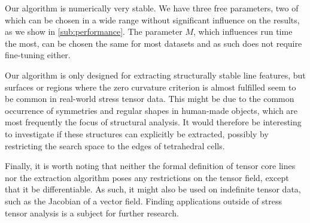 %
Our algorithm is numerically very stable.
%
We have three free parameters, two of which can be chosen in a wide range
without significant influence on the results, as we show in
\cref{sub:performance}.
%
The parameter $M$, which influences run time the most, can be chosen the same
for most datasets and as such does not require fine-tuning either.
%

%
Our algorithm is only designed for extracting structurally stable line
features, but surfaces or regions where the zero curvature criterion is
almost fulfilled seem to be common in real-world stress tensor data.
%
This might be due to the common occurrence of symmetries and regular shapes in
human-made objects, which are most frequently the focus of structural analysis.
%
It would therefore be interesting to investigate if these structures can
explicitly be extracted, possibly by restricting the search space to the edges
of tetrahedral cells.
%

%
Finally, it is worth noting that neither the formal definition of tensor core
lines nor the extraction algorithm poses any restrictions on the tensor field,
except that it be differentiable.
%
As such, it might also be used on indefinite tensor data, such as the Jacobian
of a vector field.
%
Finding applications outside of stress tensor analysis is a subject for further
research.
%
